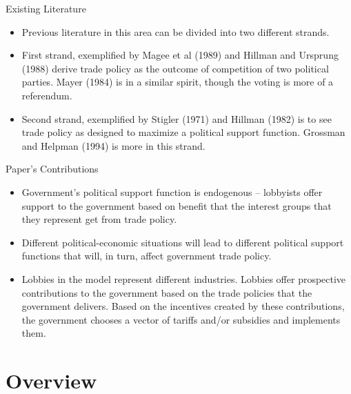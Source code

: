 \documentclass[aspectratio=169]{beamer}
\begin{document}

\begin{frame}{Existing Literature}

\begin{itemize}
    \item<1-> Previous literature in this area can be divided into two different strands.
    \item<2-> First strand, exemplified by Magee et al (1989) and Hillman and Ursprung (1988) derive trade policy as the outcome of competition of two political parties.  Mayer (1984) is in a similar spirit, though the voting is more of a referendum.
    \item<3-> Second strand, exemplified by Stigler (1971) and Hillman (1982) is to see trade policy as designed to maximize a political support function.  Grossman and Helpman (1994) is more in this strand.
\end{itemize}
    
\end{frame}


\begin{frame}{Paper's Contributions}

\begin{itemize}
    \item<1-> Government’s political support function is endogenous – lobbyists offer support to the government based on benefit that the interest groups that they represent get from trade policy.
    \item<2-> Different political-economic situations will lead to different political support functions that will, in turn, affect government trade policy.
    \item<3-> Lobbies in the model represent different industries.  Lobbies offer prospective contributions to the government based on the trade policies that the government delivers.  Based on the incentives created by these contributions, the government chooses a vector of tariffs and/or subsidies and implements them.
\end{itemize}
    
\end{frame}


\section{Overview}
\end{document}
